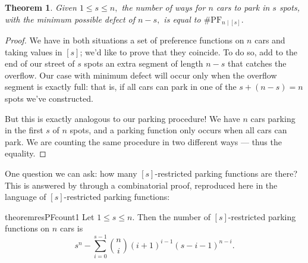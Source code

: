 \documentclass[12 pt]{amsart}
\newtheorem{theorem}{Theorem}[section]
\theoremstyle{definition} %
\theoremstyle{remark} %
\begin{document}
\begin{theorem}
    Given $1\le s\le n,$ the number of ways for $n$ cars to park in $s$ spots, with the minimum possible defect of $n-s,$ is equal to $\# \mathrm{PF}_{n \mid [s]}.$
\end{theorem}

\begin{proof}
    We have in both situations a set of preference functions on $n$ cars and taking values in $[s]$; we'd like to prove that they coincide. To do so, add to the end of our street of $s$ spots an extra segment of length $n-s$ that catches the overflow. Our case with minimum defect will occur only when the overflow segment is exactly full: that is, if all cars can park in one of the $s+(n-s)=n$ spots we've constructed.

    But this is exactly analogous to our parking procedure! We have $n$ cars parking in the first $s$ of $n$ spots, and a parking function only occurs when all cars can park. We are counting the same procedure in two different ways --- thus the equality.
\end{proof}

One question we can ask: how many $[s]$-restricted parking functions are there? This is answered by \cite{cameron-johannsen-prellberg-schweitzer-2008} through a combinatorial proof, reproduced here in the language of $[s]$-restricted parking functions:

\begin{restatable}{theorem}{resPFcount1}
    \label{thm:resPFcount1}
    Let $1\le s\le n.$ Then the number of $[s]$-restricted parking functions on $n$ cars is
    \[s^{n} - \sum_{i = 0}^{s - 1} \binom{n}{i} (i + 1)^{i - 1} (s - i - 1)^{n - i}.\]
\end{restatable}
\end{document}
